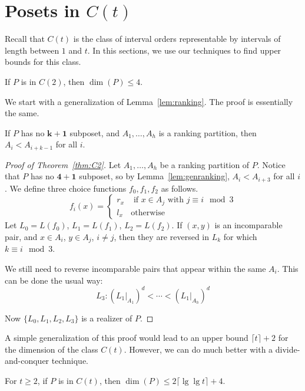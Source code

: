 \section{Posets in $C(t)$}

Recall that $C(t)$ is the class of interval orders representable by intervals of length between $1$ and $t$. In this sections, we use our techniques to find upper bounds for this class.

\begin{theorem}\label{thm:C2}
If $P$ is in $C(2)$, then $\dim(P)\leq 4$.
\end{theorem}

We start with a generalization of Lemma~\ref{lem:ranking}. The proof is essentially the same.

\begin{lemma}\label{lem:genranking}
If $P$ has no $\mathbf{k}+\mathbf{1}$ subposet, and $A_1,\ldots,A_h$ is a ranking partition, then $A_i<A_{i+k-1}$ for all $i$.
\end{lemma}

\begin{proof}[Proof of Theorem~\ref{thm:C2}]
Let $A_1,\ldots,A_h$ be a ranking partition of $P$. Notice that $P$ has no $\mathbf{4}+\mathbf{1}$ subposet, so by Lemma~\ref{lem:genranking}, $A_i<A_{i+3}$ for all $i$. We define three choice functions $f_0,f_1,f_2$ as follows.
\[
f_i(x)=
\begin{cases}
r_x&\text{ if $x\in A_j$ with $j\equiv i\mod 3$}\\
l_x&\text{otherwise}
\end{cases}
\]
Let $L_0=L(f_0)$, $L_1=L(f_1)$, $L_2=L(f_2)$. If $(x,y)$ is an incomparable pair, and $x\in A_i$, $y\in A_j$, $i\neq j$, then they are reversed in $L_k$ for which $k\equiv i\mod 3$.

We still need to reverse incomparable pairs that appear within the same $A_i$. This can be done the usual way:
\[
L_3:(L_1|_{A_1})^d<\cdots<(L_1|_{A_h})^d
\]

Now $\{L_0,L_1,L_2,L_3\}$ is a realizer of $P$.
\end{proof}

A simple generalization of this proof would lead to an upper bound $\lceil t\rceil+2$ for the dimension of the class $C(t)$. However, we can do much better with a divide-and-conquer technique.

\begin{theorem}\label{thm:Ct}
For $t\geq 2$, if $P$ is in $C(t)$, then $\dim(P)\leq 2\lceil\lg\lg t\rceil+4$.
\end{theorem}


